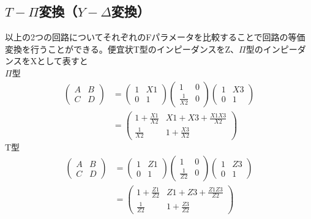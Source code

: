 \subsection{$T-\Pi$変換（$Y-\Delta$変換）}
以上の2つの回路についてそれぞれのFパラメータを比較することで回路の等価変換を行うことができる。便宜状T型のインピーダンスをZ、$\Pi$型のインピーダンスをXとして表すと
\\
$\Pi$型\\
\begin{eqnarray}
    \begin{pmatrix}A&B\\C&D\end{pmatrix} &= \begin{pmatrix}1&X1\\0&1\end{pmatrix}\begin{pmatrix}1&0\\\frac{1}{X2}&0\end{pmatrix}\begin{pmatrix}1&X3\\0&1\end{pmatrix}\\
    &=\begin{pmatrix}1+\frac{X1}{X2}&X1+X3+\frac{X1X3}{X2}\\\frac{1}{X2}&1+\frac{X3}{X2}\end{pmatrix}
\end{eqnarray}
T型\\
\begin{eqnarray}
    \begin{pmatrix}A&B\\C&D\end{pmatrix} &= \begin{pmatrix}1&Z1\\0&1\end{pmatrix}\begin{pmatrix}1&0\\\frac{1}{Z2}&0\end{pmatrix}\begin{pmatrix}1&Z3\\0&1\end{pmatrix}\\
    &=\begin{pmatrix}1+\frac{Z1}{Z2}&Z1+Z3+\frac{Z1Z3}{Z2}\\\frac{1}{Z2}&1+\frac{Z3}{Z2}\end{pmatrix}
\end{eqnarray}

